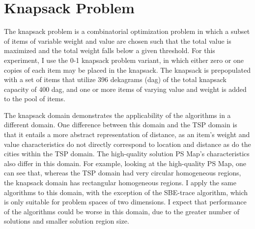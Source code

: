 





\section{Knapsack Problem}

The knapsack problem is a combinatorial optimization problem in which a subset of items of variable weight and value are chosen such that the total value is maximized and the total weight falls below  a given threshold.  For this experiment, I use the 0-1 knapsack problem variant, in which either zero or one copies of each item may be placed in the knapsack.  The knapsack is prepopulated with a set of items that utilize 396 dekagrams (dag) of the total knapsack capacity of 400 dag, and one or more items  of varying value and weight is added to the pool of items.

The knapsack domain demonstrates the applicability of the algorithms in a different domain.  One difference between this domain and the TSP domain is that it entails a more abstract representation of distance, as an item's  weight and value characteristics do not directly correspond to location and  distance as do the cities within the TSP domain. The high-quality solution PS Map's characteristics also differ in this domain.  For example, looking at the high-quality PS Map, one can see that, whereas the TSP domain had very circular homogeneous regions, the knapsack domain has rectangular homogeneous regions.  I apply the same algorithms to this domain, with the exception of the SBE-trace algorithm, which is only suitable for problem spaces of two dimensions.  I expect that performance of the algorithms could be worse in this domain, due to the greater number of solutions and smaller solution region size.



